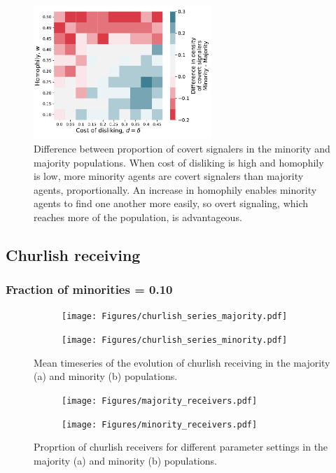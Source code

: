 \documentclass[11pt,letterpaper]{article}
\begin{document}
\begin{figure}[H]
  \centering
    \includegraphics[width=0.6\textwidth]{Figures/covert_signalers_diff_005.pdf}
  \caption{Difference between proportion of covert signalers in the minority 
    and majority populations. When cost of disliking is high and homophily is 
    low, more minority agents are covert signalers than majority agents,
    proportionally. An increase in homophily enables minority agents to 
    find one another more easily, so overt signaling, which reaches more of
    the population, is advantageous.
  }
  \label{fig:}
\end{figure}


\subsection{Churlish receiving}

\subsubsection{Fraction of minorities = 0.10}

\begin{figure}[H]
  \centering
  \begin{subfigure}{0.49\textwidth}
    \centering
    \texttt{[image: Figures/churlish\_series\_majority.pdf]}
    \caption{}
    \label{fig:}
  \end{subfigure}
  \begin{subfigure}{0.49\textwidth}
    \centering
    \texttt{[image: Figures/churlish\_series\_minority.pdf]}
    \caption{}
    \label{fig:}
  \end{subfigure}
  \caption{Mean timeseries of the evolution of churlish receiving in the
    majority (a) and minority (b) populations.}
  \label{fig:regressions}
\end{figure}


\begin{figure}[H]
  \centering
  \begin{subfigure}{0.49\textwidth}
    \centering
    \texttt{[image: Figures/majority\_receivers.pdf]}
    \caption{}
    \label{fig:}
  \end{subfigure}
  \begin{subfigure}{0.49\textwidth}
    \centering
    \texttt{[image: Figures/minority\_receivers.pdf]}
    \caption{}
    \label{fig:}
  \end{subfigure}
  \caption{Proprtion of churlish receivers for different parameter settings in the
    majority (a) and minority (b) populations.}
  \label{fig:regressions}
\end{figure}
\end{document}

